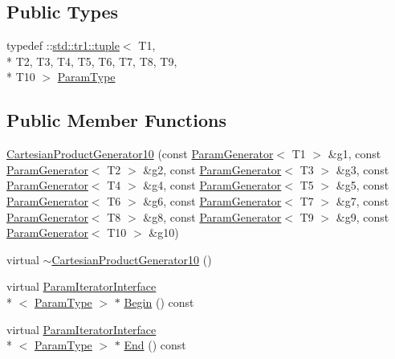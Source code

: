 \subsection*{Public Types}
\begin{DoxyCompactItemize}
\item 
typedef \-::\hyperlink{classstd_1_1tr1_1_1tuple}{std\-::tr1\-::tuple}$<$ T1, \\*
T2, T3, T4, T5, T6, T7, T8, T9, \\*
T10 $>$ \hyperlink{classtesting_1_1internal_1_1CartesianProductGenerator10_aa483a5910f5dbfb974b43f93853f4b29}{Param\-Type}
\end{DoxyCompactItemize}
\subsection*{Public Member Functions}
\begin{DoxyCompactItemize}
\item 
\hyperlink{classtesting_1_1internal_1_1CartesianProductGenerator10_a53d945670e910c0baaf14f3d25f1bbb6}{Cartesian\-Product\-Generator10} (const \hyperlink{classtesting_1_1internal_1_1ParamGenerator}{Param\-Generator}$<$ T1 $>$ \&g1, const \hyperlink{classtesting_1_1internal_1_1ParamGenerator}{Param\-Generator}$<$ T2 $>$ \&g2, const \hyperlink{classtesting_1_1internal_1_1ParamGenerator}{Param\-Generator}$<$ T3 $>$ \&g3, const \hyperlink{classtesting_1_1internal_1_1ParamGenerator}{Param\-Generator}$<$ T4 $>$ \&g4, const \hyperlink{classtesting_1_1internal_1_1ParamGenerator}{Param\-Generator}$<$ T5 $>$ \&g5, const \hyperlink{classtesting_1_1internal_1_1ParamGenerator}{Param\-Generator}$<$ T6 $>$ \&g6, const \hyperlink{classtesting_1_1internal_1_1ParamGenerator}{Param\-Generator}$<$ T7 $>$ \&g7, const \hyperlink{classtesting_1_1internal_1_1ParamGenerator}{Param\-Generator}$<$ T8 $>$ \&g8, const \hyperlink{classtesting_1_1internal_1_1ParamGenerator}{Param\-Generator}$<$ T9 $>$ \&g9, const \hyperlink{classtesting_1_1internal_1_1ParamGenerator}{Param\-Generator}$<$ T10 $>$ \&g10)
\item 
virtual \hyperlink{classtesting_1_1internal_1_1CartesianProductGenerator10_a9f3d5098141855055fe174dda57092d7}{$\sim$\-Cartesian\-Product\-Generator10} ()
\item 
virtual \hyperlink{classtesting_1_1internal_1_1ParamIteratorInterface}{Param\-Iterator\-Interface}\\*
$<$ \hyperlink{classtesting_1_1internal_1_1CartesianProductGenerator10_aa483a5910f5dbfb974b43f93853f4b29}{Param\-Type} $>$ $\ast$ \hyperlink{classtesting_1_1internal_1_1CartesianProductGenerator10_a1b3ac46cd0f29e9654ee0afa18490798}{Begin} () const 
\item 
virtual \hyperlink{classtesting_1_1internal_1_1ParamIteratorInterface}{Param\-Iterator\-Interface}\\*
$<$ \hyperlink{classtesting_1_1internal_1_1CartesianProductGenerator10_aa483a5910f5dbfb974b43f93853f4b29}{Param\-Type} $>$ $\ast$ \hyperlink{classtesting_1_1internal_1_1CartesianProductGenerator10_ab8a229952b2bf4ab2eb6f444bc4c4cee}{End} () const 
\end{DoxyCompactItemize}


